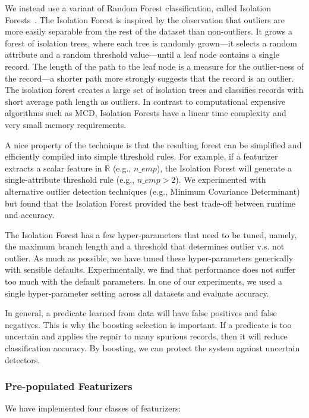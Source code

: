 We instead use a variant of Random Forest classification, called Isolation Forests~\cite{liu2008isolation}.  The Isolation Forest is inspired by the observation that outliers are more easily separable from the rest of the dataset than non-outliers.  It grows a forest of isolation trees, where each tree is randomly grown---it selects a random attribute and a random threshold value---until a leaf node contains a single record.  The length of the path to the leaf node is a measure for the outlier-ness of the record---a shorter path more strongly suggests that the record is an outlier.  The isolation forest creates a large set of isolation trees and classifies records with short average path length as outliers.  In contrast to computational expensive algorithms such as MCD, Isolation Forests have a linear time complexity and very small memory requirements.  

A nice property of the technique is that the resulting forest can be simplified and efficiently compiled into simple threshold rules. 
For example, if a featurizer extracts a scalar feature in $\mathbb{R}$ (e.g., $n\_emp$), the Isolation Forest will generate a single-attribute threshold rule (e.g., $n\_emp > 2$).  
 We experimented with alternative outlier detection techniques (e.g., Minimum Covariance Determinant) but found that the Isolation Forest provided the best trade-off between runtime and accuracy.
 
 The Isolation Forest has a few hyper-parameters that need to be tuned, namely, the maximum branch length and a threshold that determines outlier v.s. not outlier. As much as possible, we have tuned these hyper-parameters generically with sensible defaults. Experimentally, we find that performance does not suffer too much with the default parameters.
In one of our experiments, we used a single hyper-parameter setting across all datasets and evaluate accuracy. 
 
 In general, a predicate learned from data will have false positives and false negatives.
This is why the boosting selection is important.
If a predicate is too uncertain and applies the repair to many spurious records, then it will reduce classification accuracy.
By boosting, we can protect the system against uncertain detectors.

\subsubsection{Pre-populated Featurizers}
\noindent We have implemented four classes of featurizers:

